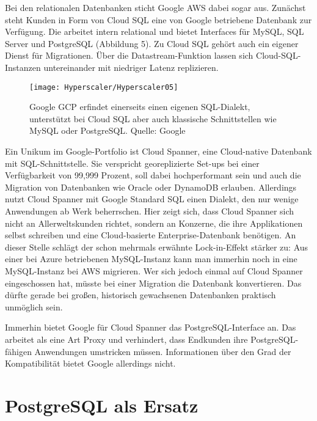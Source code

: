 Bei den relationalen Datenbanken sticht Google AWS dabei sogar aus. Zunächst steht Kunden in Form von Cloud SQL eine von Google betriebene Datenbank zur Verfügung. Die arbeitet intern relational und bietet Interfaces für MySQL, SQL Server und PostgreSQL (Abbildung 5). Zu Cloud SQL gehört auch ein eigener Dienst für Migrationen. Über die Datastream-Funktion lassen sich Cloud-SQL-Instanzen untereinander mit niedriger Latenz replizieren.


\begin{figure}
	
	\begin{center}
		
		\texttt{[image: Hyperscaler/Hyperscaler05]}
		
		\caption[Google GCP]{Google GCP erfindet einerseits einen eigenen SQL-Dialekt, unterstützt bei Cloud SQL aber auch klassische Schnittstellen wie MySQL oder PostgreSQL. Quelle: Google}
	\end{center} 
\end{figure}


Ein Unikum im Google-Portfolio ist Cloud Spanner, eine Cloud-native Datenbank mit SQL-Schnittstelle. Sie verspricht georeplizierte Set-ups bei einer Verfügbarkeit von 99,999 Prozent, soll dabei hochperformant sein und auch die Migration von Datenbanken wie Oracle oder DynamoDB erlauben. Allerdings nutzt Cloud Spanner mit Google Standard SQL einen Dialekt, den nur wenige Anwendungen ab Werk beherrschen. Hier zeigt sich, dass Cloud Spanner sich nicht an Allerweltskunden richtet, sondern an Konzerne, die ihre Applikationen selbst schreiben und eine Cloud-basierte Enterprise-Datenbank benötigen. An dieser Stelle schlägt der schon mehrmals erwähnte Lock-in-Effekt stärker zu: Aus einer bei Azure betriebenen MySQL-Instanz kann man immerhin noch in eine MySQL-Instanz bei AWS migrieren. Wer sich jedoch einmal auf Cloud Spanner eingeschossen hat, müsste bei einer Migration die Datenbank konvertieren. Das dürfte gerade bei großen, historisch gewachsenen Datenbanken praktisch unmöglich sein.

Immerhin bietet Google für Cloud Spanner das PostgreSQL-Interface an. Das arbeitet als eine Art Proxy und verhindert, dass Endkunden ihre PostgreSQL-fähigen Anwendungen umstricken müssen. Informationen über den Grad der Kompatibilität bietet Google allerdings nicht.

\section{PostgreSQL als Ersatz}

